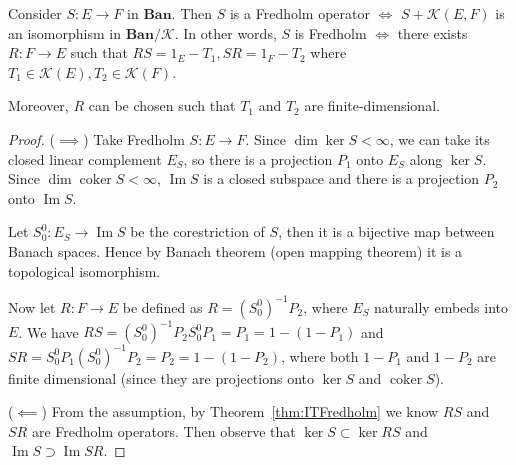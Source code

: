 \begin{theorem}
	\label{thm:NikolskiiAtkinson}
	Consider $S : E \to F$ in $\mathbf{Ban}$. Then $S$ is a Fredholm operator $\iff $ $S + \mathcal{K}(E, F)$ is an isomorphism in $\mathbf{Ban}/\mathcal{K}$. In other words, $S$ is Fredholm $\iff $ there exists $R: F \to E$ such that $RS = 1_E - T_1, SR = 1_F - T_2$ where $T_1 \in \mathcal{K}(E), T_2 \in \mathcal{K}(F)$.

	Moreover, $R$ can be chosen such that $T_1$ and $T_2$ are finite-dimensional.
	
\end{theorem}
\begin{proof}
	($\implies$)
	Take Fredholm $S: E \to F$. Since  $\operatorname{dim} \operatorname{ker} S < \infty $, we can take its closed linear complement $E_S$, so there is a projection $P_1$ onto $E_S$ along $\operatorname{ker} S$. Since $\operatorname{dim} \operatorname{coker} S < \infty $, $\operatorname{Im} S$ is a closed subspace and there is a projection $P_2$ onto $\operatorname{Im} S$. 

	Let $S_0^0: E_S \to \operatorname{Im} S$ be the corestriction of $S$, then it is a bijective map between Banach spaces. Hence by Banach theorem (open mapping theorem) it is a topological isomorphism. 

	Now let $R: F \to E$ be defined as $R = (S_0^0)^{-1} P_2$, where $E_S$ naturally embeds into $E$. We have $RS = (S_0^0)^{-1} P_2 S_0^0 P_1 = P_1 = 1 - (1 - P_1)$ and $SR = S_0^0 P_1 (S_0^0)^{-1} P_2 = P_2 = 1 - (1 - P_2)$, where both $1 - P_1$ and $1 - P_2$ are finite dimensional (since they are projections onto $\operatorname{ker} S$ and $\operatorname{coker} S$).

	($\impliedby$) From the assumption, by Theorem~\ref{thm:ITFredholm} we know $RS$ and $SR$ are Fredholm operators. Then observe that $\operatorname{ker} S \subset \operatorname{ker} RS$ and $\operatorname{Im} S \supset \operatorname{Im} SR$.

\end{proof}

